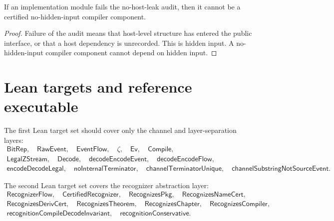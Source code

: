 \begin{theorem}
\label{thm:implementation-interface-no-host-leak-required}
If an implementation module fails the no-host-leak audit, then it cannot be a certified no-hidden-input compiler component.
\end{theorem}

\begin{proof}
Failure of the audit means that host-level structure has entered the public interface, or that a host dependency is unrecorded. This is hidden input. A no-hidden-input compiler component cannot depend on hidden input.
\end{proof}

\section{Lean targets and reference executable}
\label{sec:implementation-interface-lean-targets-reference}

\begin{definition}
\label{def:implementation-interface-core-lean-targets}
The first Lean target set should cover only the channel and layer-separation layers:
$$
\begin{gathered}
  \mathsf{BitRep},\quad
  \mathsf{RawEvent},\quad
  \mathsf{EventFlow},\quad
  \zeta,\quad
  \mathsf{Ev},\quad
  \mathsf{Compile},\\
  \mathsf{LegalZStream},\quad
  \mathsf{Decode},\quad
  \mathsf{decodeEncodeEvent},\quad
  \mathsf{decodeEncodeFlow},\\
  \mathsf{encodeDecodeLegal},\quad
  \mathsf{noInternalTerminator},\quad
  \mathsf{channelTerminatorUnique},\quad
  \mathsf{channelSubstringNotSourceEvent}.
\end{gathered}
$$
\end{definition}

\begin{definition}
\label{def:implementation-interface-recognizer-lean-targets}
The second Lean target set covers the recognizer abstraction layer:
$$
\begin{gathered}
  \mathsf{RecognizerFlow},\quad
  \mathsf{CertifiedRecognizer},\quad
  \mathsf{RecognizesPkg},\quad
  \mathsf{RecognizesNameCert},\\
  \mathsf{RecognizesDerivCert},\quad
  \mathsf{RecognizesTheorem},\quad
  \mathsf{RecognizesChapter},\quad
  \mathsf{RecognizesCompiler},\\
  \mathsf{recognitionCompileDecodeInvariant},\quad
  \mathsf{recognitionConservative}.
\end{gathered}
$$
\end{definition}

